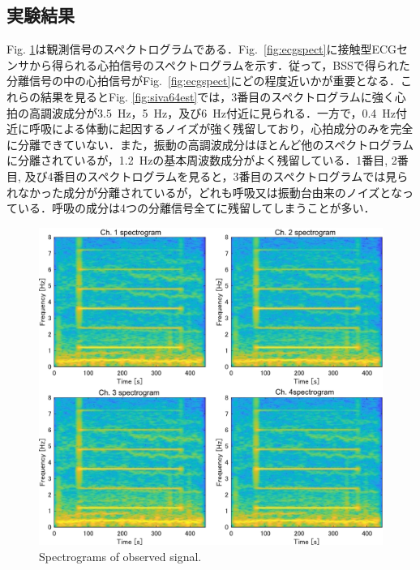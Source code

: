 \documentclass[10.5pt]{jarticle}
\begin{document}
{%
\subsection{実験結果}
\hspace{1.0em}Fig. \ref{fig:siva32obs}は観測信号のスペクトログラムである．Fig.~\ref{fig:ecgspect}に接触型ECGセンサから得られる心拍信号のスペクトログラムを示す．従って，BSSで得られた分離信号の中の心拍信号がFig.~\ref{fig:ecgspect}にどの程度近いかが重要となる．これらの結果を見るとFig. \ref{fig:siva64est}では，3番目のスペクトログラムに強く心拍の高調波成分が3.5~Hz，5~Hz，及び6~Hz付近に見られる．一方で，0.4~Hz付近に呼吸による体動に起因するノイズが強く残留しており，心拍成分のみを完全に分離できていない．また，振動の高調波成分はほとんど他のスペクトログラムに分離されているが，1.2~Hzの基本周波数成分がよく残留している．1番目, 2番目, 及び4番目のスペクトログラムを見ると，3番目のスペクトログラムでは見られなかった成分が分離されているが，どれも呼吸又は振動台由来のノイズとなっている．呼吸の成分は4つの分離信号全てに残留してしまうことが多い．

\begin{figure}[tb]
\centering
\vspace{0pt} %
\includegraphics[width=1.0\hsize]{spect_iva_32_obs.pdf}
\vspace{-20pt} %
\caption{Spectrograms of observed signal.}
\vspace{-20pt} %
\label{fig:siva32obs}
\end{figure}

}
\end{document}
